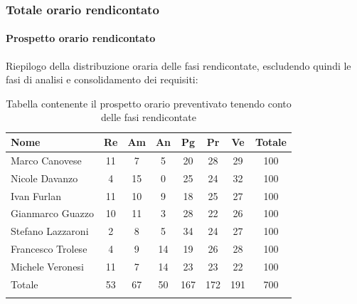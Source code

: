 \subsubsection{Totale orario rendicontato}
\paragraph{Prospetto orario rendicontato}
Riepilogo della distribuzione oraria delle fasi rendicontate, escludendo quindi le fasi di
analisi e consolidamento dei requisiti:

\begin{longtable}{|l|c|c|c|c|c|c|c|}
	\hline
	\rowcolor{lighter-grayer}
	\textbf{Nome}     & \textbf{Re} & \textbf{Am} & \textbf{An} & \textbf{Pg} & \textbf{Pr} & \textbf{Ve} & \textbf{Totale} \\
	\hline
	\endfirsthead

	\hline
	Marco Canovese    & 11          & 7           & 5           & 20          & 28          & 29          & 100             \\
	\hline
	\hline
	Nicole Davanzo    & 4           & 15          & 0           & 25          & 24          & 32          & 100             \\
	\hline
	\hline
	Ivan Furlan       & 11          & 10          & 9           & 18          & 25          & 27          & 100             \\
	\hline
	\hline
	Gianmarco Guazzo  & 10          & 11          & 3           & 28          & 22          & 26          & 100             \\
	\hline
	\hline
	Stefano Lazzaroni & 2           & 8           & 5           & 34          & 24          & 27          & 100             \\
	\hline
	\hline
	Francesco Trolese & 4           & 9           & 14          & 19          & 26          & 28          & 100             \\
	\hline
	\hline
	Michele Veronesi  & 11          & 7           & 14          & 23          & 23          & 22          & 100             \\
	\hline
	\hline
	Totale            & 53          & 67          & 50          & 167         & 172         & 191         & 700             \\
	\hline
	\rowcolor{white}
	\caption{Tabella contenente il prospetto orario preventivato tenendo conto delle fasi rendicontate}
\end{longtable}


